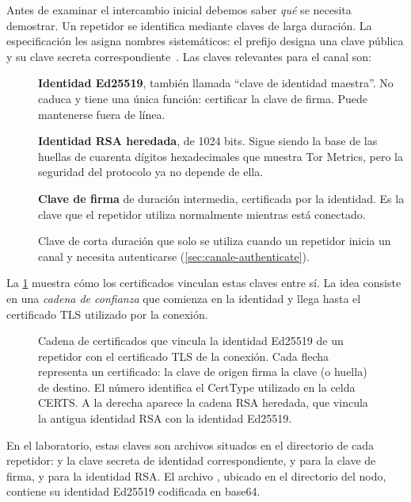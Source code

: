 Antes de examinar el intercambio inicial debemos saber \emph{qué} se necesita demostrar. Un repetidor se identifica mediante claves de larga duración. La especificación les asigna nombres sistemáticos: el prefijo  designa una clave pública y  su clave secreta correspondiente~. Las claves relevantes para el canal son:

\begin{description}
  \item[] \textbf{Identidad Ed25519}, también llamada \enquote{clave de identidad maestra}. No caduca y tiene una única función: certificar la clave de firma. Puede mantenerse fuera de línea.
  \item[] \textbf{Identidad RSA heredada}, de 1024 bits. Sigue siendo la base de las huellas de cuarenta dígitos hexadecimales que muestra Tor Metrics, pero la seguridad del protocolo ya no depende de ella.
  \item[] \textbf{Clave de firma} de duración intermedia, certificada por la identidad. Es la clave que el repetidor utiliza normalmente mientras está conectado.
  \item[] Clave de corta duración que solo se utiliza cuando un repetidor inicia un canal y necesita autenticarse (\cref{sec:canale-authenticate}).
\end{description}

La \cref{fig:chiavi-relay} muestra cómo los certificados vinculan estas claves entre sí. La idea consiste en una \emph{cadena de confianza} que comienza en la identidad y llega hasta el certificado TLS utilizado por la conexión.

\begin{figure}[htbp]
\centering

\caption{Cadena de certificados que vincula la identidad Ed25519 de un repetidor con el certificado TLS de la conexión. Cada flecha representa un certificado: la clave de origen firma la clave (o huella) de destino. El número identifica el CertType utilizado en la celda CERTS. A la derecha aparece la cadena RSA heredada, que vincula la antigua identidad RSA con la identidad Ed25519.}
\label{fig:chiavi-relay}
\end{figure}

En el laboratorio, estas claves son archivos situados en el directorio  de cada repetidor:  y la clave secreta de identidad correspondiente,  y  para la clave de firma, y  para la identidad RSA. El archivo , ubicado en el directorio del nodo, contiene su identidad Ed25519 codificada en base64.

